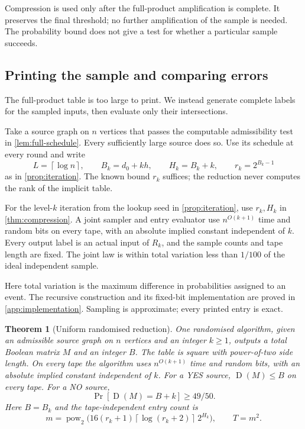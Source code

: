 \documentclass[11pt]{article} \usepackage[utf8]{inputenc}
\theoremstyle{plain} \newtheorem{theorem}{Theorem}[section]
\theoremstyle{definition} \newaliascnt{definition}{theorem}
\newcommand{\D}{\operatorname{D}}
\newcommand{\ceil}[1]{\left\lceil#1\right\rceil}
\begin{document}
Compression is used only after the full-product amplification is complete.
It preserves the final threshold; no further amplification of the sample is
needed. The probability bound does not give a test for whether a particular
sample succeeds.

\subsection{Printing the sample and comparing errors}
\label{sec:reduction}
\label{sec:randomised_reduction}

The full-product table is too large to print. We instead generate complete
labels for the sampled inputs, then evaluate only their intersections.

Take a source graph on $n$ vertices that passes the computable admissibility
test in \cref{lem:full-schedule}. Every sufficiently large source does so.
Use its schedule at every round and write
\[
L=\ceil{\log n},\qquad B_k=d_0+kh,\qquad H_k=B_k+k,\qquad r_k=2^{B_k-1}
\]
as in \cref{prop:iteration}. The known bound $r_k$ suffices; the reduction
never computes the rank of the implicit table.

\begin{lemma}\label{lem:sample-access}
For the level-$k$ iteration from the lookup seed in \cref{prop:iteration}, use
$r_k,H_k$ in \cref{thm:compression}. A joint sampler and entry evaluator use $n^{O(k+1)}$
time and random bits on every tape, with an absolute implied constant
independent of $k$. Every output label is an actual input of $R_k$, and the
sample counts and tape length are fixed. The joint law is within total
variation less than $1/100$ of the ideal independent sample.
\end{lemma}

Here total variation is the maximum difference in probabilities assigned to an
event. The recursive construction and its fixed-bit implementation are proved
in \cref{app:implementation}. Sampling is approximate; every printed entry is
exact.

\begin{theorem}[Uniform randomised reduction]\label{thm:uniform-reduction}
One randomised algorithm, given an admissible source graph on $n$ vertices and
an integer $k\ge1$, outputs a total Boolean matrix $M$ and an integer $B$.
The table is square with power-of-two side length. On every tape the algorithm
uses $n^{O(k+1)}$ time and random bits, with an absolute implied
constant independent of $k$. For a YES source, $\D(M)\le B$ on every tape.
For a NO source,
\[
\Pr[\D(M)=B+k]\ge49/50.
\]
Here $B=B_k$ and the tape-independent entry count is
\[
m=\operatorname{pow}_2\bigl(16(r_k+1)\ceil{\log(r_k+2)}\,2^{H_k}\bigr),
\qquad T=m^2.
\]
\end{theorem}
\end{document}
